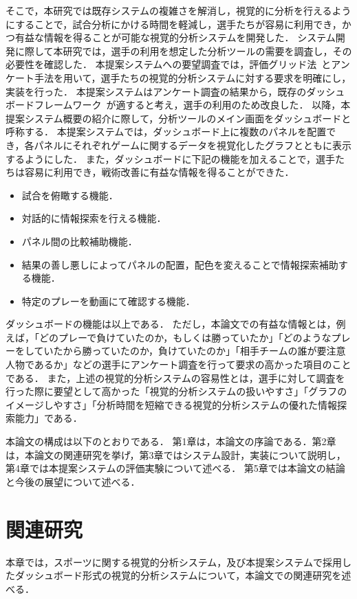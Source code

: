 \documentclass[sotsuron]{kuee}
\begin{document}
	そこで，本研究では既存システムの複雑さを解消し，視覚的に分析を行えるようにすることで，試合分析にかける時間を軽減し，選手たちが容易に利用でき，かつ有益な情報を得ることが可能な視覚的分析システムを開発した．
	システム開発に際して本研究では，選手の利用を想定した分析ツールの需要を調査し，その必要性を確認した．
	本提案システムへの要望調査では，評価グリッド法~\cite{EGM}とアンケート手法を用いて，選手たちの視覚的分析システムに対する要求を明確にし，実装を行った．
	本提案システムはアンケート調査の結果から，既存のダッシュボードフレームワーク~\cite{dashboard}が適すると考え，選手の利用のため改良した．
	以降，本提案システム概要の紹介に際して，分析ツールのメイン画面をダッシュボードと呼称する．
	本提案システムでは，ダッシュボード上に複数のパネルを配置でき，各パネルにそれぞれゲームに関するデータを視覚化したグラフとともに表示するようにした．
	また，ダッシュボードに下記の機能を加えることで，選手たちは容易に利用でき，戦術改善に有益な情報を得ることができた．
		\begin{itemize}
			\item 試合を俯瞰する機能．
			\item 対話的に情報探索を行える機能．
			\item パネル間の比較補助機能．
			\item 結果の善し悪しによってパネルの配置，配色を変えることで情報探索補助する機能．
			\item 特定のプレーを動画にて確認する機能．
		\end{itemize}
	ダッシュボードの機能は以上である．
	ただし，本論文での有益な情報とは，例えば，「どのプレーで負けていたのか，もしくは勝っていたか」「どのようなプレーをしていたから勝っていたのか，負けていたのか」「相手チームの誰が要注意人物であるか」などの選手にアンケート調査を行って要求の高かった項目のことである．
	また，上述の視覚的分析システムの容易性とは，選手に対して調査を行った際に要望として高かった「視覚的分析システムの扱いやすさ」「グラフのイメージしやすさ」「分析時間を短縮できる視覚的分析システムの優れた情報探索能力」である．
	
	本論文の構成は以下のとおりである．
	第1章は，本論文の序論である．第2章は，本論文の関連研究を挙げ，第3章ではシステム設計，実装について説明し，第4章では本提案システムの評価実験について述べる．
	第5章では本論文の結論と今後の展望について述べる．

\chapter{関連研究}
	本章では，スポーツに関する視覚的分析システム，及び本提案システムで採用したダッシュボード形式の視覚的分析システムについて，本論文での関連研究を述べる．
	
\end{document}
